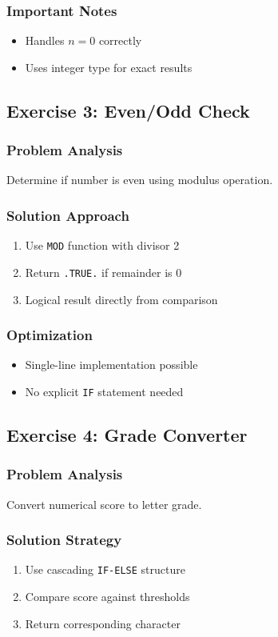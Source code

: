\documentclass{book}
\begin{document}
\subsubsection*{Important Notes}
\begin{itemize}
\item Handles \( n = 0 \) correctly
\item Uses integer type for exact results
\end{itemize}

\subsection*{Exercise 3: Even/Odd Check}
\subsubsection*{Problem Analysis}
Determine if number is even using modulus operation.

\subsubsection*{Solution Approach}
\begin{enumerate}
\item Use \texttt{MOD} function with divisor 2
\item Return \texttt{.TRUE.} if remainder is 0
\item Logical result directly from comparison
\end{enumerate}

\subsubsection*{Optimization}
\begin{itemize}
\item Single-line implementation possible
\item No explicit \texttt{IF} statement needed
\end{itemize}

\subsection*{Exercise 4: Grade Converter}
\subsubsection*{Problem Analysis}
Convert numerical score to letter grade.

\subsubsection*{Solution Strategy}
\begin{enumerate}
\item Use cascading \texttt{IF-ELSE} structure
\item Compare score against thresholds
\item Return corresponding character
\end{enumerate}
\end{document}
